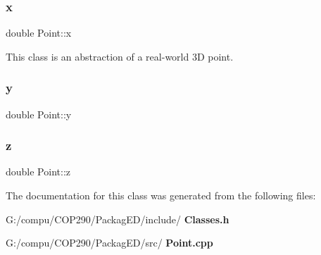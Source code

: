 \subsubsection{x}
{\footnotesize\ttfamily double Point\+::x}

This class is an abstraction of a real-\/world 3D point. \mbox{\label{class_point_afa38be143ae800e6ad69ce8ed4df62d8}} 
\subsubsection{y}
{\footnotesize\ttfamily double Point\+::y}

\mbox{\label{class_point_a05ba3b1dfcb19430582ae953cbbfbded}} 
\subsubsection{z}
{\footnotesize\ttfamily double Point\+::z}



The documentation for this class was generated from the following files\+:\begin{DoxyCompactItemize}
\item 
G\+:/compu/\+C\+O\+P290/\+Packag\+E\+D/include/\textbf{ Classes.\+h}\item 
G\+:/compu/\+C\+O\+P290/\+Packag\+E\+D/src/\textbf{ Point.\+cpp}\end{DoxyCompactItemize}
